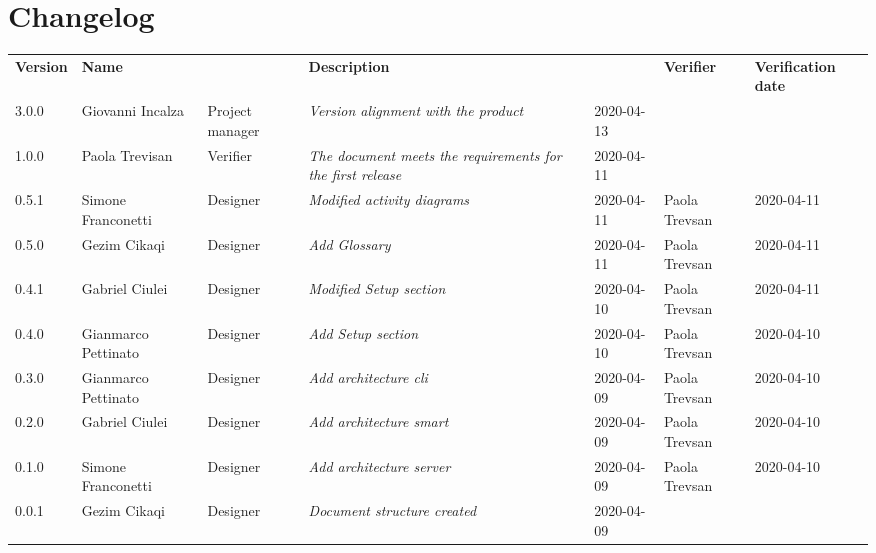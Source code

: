 \section*{Changelog}
\renewcommand{\arraystretch}{1.8}
  \setlength\LTleft{-1.7cm}
  \begin{longtable}{|p{1.7cm}|p{2cm}|p{2.5cm}|p{3cm}|p{1.7cm}|p{2cm}|p{2.3cm}|}
    \hline
    \rowcolor{header}
    \textbf{Version} & \textbf{Name} & \centering{\textbf{Role}} & \textbf{Description} &      \centering{\textbf{Date}} & \textbf{Verifier} & \textbf{Verification date} \\

    3.0.0 & Giovanni Incalza & Project manager & \small{\textit{Version alignment with the product}} & 2020-04-13 &  & \\

    1.0.0 & Paola Trevisan & Verifier & \small{\textit{The document meets the requirements for the first release}} & 2020-04-11 &  & \\
    0.5.1 & Simone Franconetti & Designer & \small{\textit{Modified activity diagrams}} & 2020-04-11 & Paola Trevsan & 2020-04-11\\
    0.5.0 & Gezim Cikaqi & Designer & \small{\textit{Add Glossary}} & 2020-04-11 &Paola Trevsan  & 2020-04-11\\
    0.4.1 & Gabriel Ciulei & Designer & \small{\textit{Modified Setup section}} & 2020-04-10 &Paola Trevsan  & 2020-04-11\\
    0.4.0 & Gianmarco Pettinato & Designer & \small{\textit{Add Setup section}} & 2020-04-10 & Paola Trevsan & 2020-04-10\\
    0.3.0 & Gianmarco Pettinato & Designer & \small{\textit{Add architecture cli}} & 2020-04-09 &Paola Trevsan  & 2020-04-10\\
    0.2.0 & Gabriel Ciulei & Designer & \small{\textit{Add architecture smart}} & 2020-04-09 & Paola Trevsan & 2020-04-10\\
    0.1.0 & Simone Franconetti & Designer & \small{\textit{Add architecture server}} & 2020-04-09 & Paola Trevsan & 2020-04-10\\
    0.0.1 & Gezim Cikaqi & Designer & \small{\textit{Document structure created}} & 2020-04-09 &  & \\

    \hline
  \end{longtable}
\setlength\LTleft{0cm}
\restoregeometry
